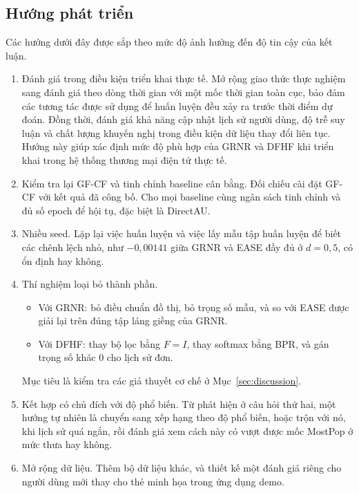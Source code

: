 \subsection{Hướng phát triển}

Các hướng dưới đây được sắp theo mức độ ảnh hưởng đến độ tin cậy của kết luận.
\begin{enumerate}
\item Đánh giá trong điều kiện triển khai thực tế. Mở rộng giao thức thực nghiệm sang đánh giá theo dòng thời gian với một mốc thời gian toàn cục, bảo đảm các tương tác được sử dụng để huấn luyện đều xảy ra trước thời điểm dự đoán. Đồng thời, đánh giá khả năng cập nhật lịch sử người dùng, độ trễ suy luận và chất lượng khuyến nghị trong điều kiện dữ liệu thay đổi liên tục. Hướng này giúp xác định mức độ phù hợp của GRNR và DFHF khi triển khai trong hệ thống thương mại điện tử thực tế.
\item Kiểm tra lại GF-CF và tinh chỉnh baseline cân bằng. Đối chiếu cài đặt GF-CF với kết quả đã công bố. Cho mọi baseline cùng ngân sách tinh chỉnh và đủ số epoch để hội tụ, đặc biệt là DirectAU.
\item Nhiều seed. Lặp lại việc huấn luyện và việc lấy mẫu tập huấn luyện để biết các chênh lệch nhỏ, như $-0{,}00141$ giữa GRNR và EASE đầy đủ ở $d=0{,}5$, có ổn định hay không.
\item Thí nghiệm loại bỏ thành phần.
  \begin{itemize}
  \item Với GRNR: bỏ điều chuẩn đồ thị, bỏ trọng số mẫu, và so với EASE được giải lại trên đúng tập láng giềng của GRNR.
  \item Với DFHF: thay bộ lọc bằng $F=I$, thay softmax bằng BPR, và gán trọng số khác 0 cho lịch sử đơn.
  \end{itemize}
  Mục tiêu là kiểm tra các giả thuyết cơ chế ở Mục~\ref{sec:discussion}.
\item Kết hợp có chủ đích với độ phổ biến. Từ phát hiện ở câu hỏi thứ hai, một hướng tự nhiên là chuyển sang xếp hạng theo độ phổ biến, hoặc trộn với nó, khi lịch sử quá ngắn, rồi đánh giá xem cách này có vượt được mốc MostPop ở mức thưa hay không.
\item Mở rộng dữ liệu. Thêm bộ dữ liệu khác, và thiết kế một đánh giá riêng cho người dùng mới thay cho thẻ minh họa trong ứng dụng demo.
\end{enumerate}
